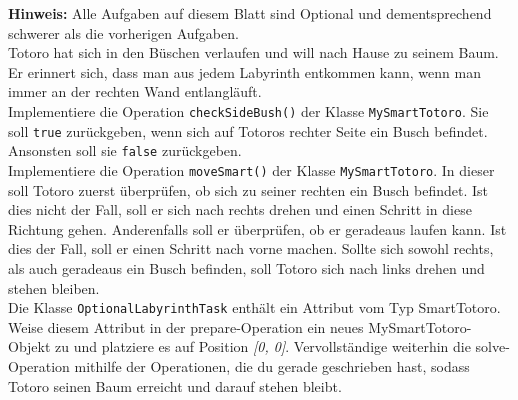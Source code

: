 
\textbf{Hinweis:} Alle Aufgaben auf diesem Blatt sind Optional und dementsprechend schwerer als die vorherigen Aufgaben.\\
	Totoro hat sich in den Büschen verlaufen und will nach Hause zu seinem Baum.
	Er erinnert sich, dass man aus jedem Labyrinth entkommen kann, wenn man immer an der rechten Wand entlangläuft.\\

		 Implementiere die Operation \lstinline{checkSideBush()} der Klasse \lstinline{MySmartTotoro}.
		Sie soll \lstinline{true} zurückgeben, wenn sich auf Totoros rechter Seite ein Busch befindet.
		Ansonsten soll sie \lstinline{false} zurückgeben.\\



		 Implementiere die Operation \lstinline{moveSmart()} der Klasse \lstinline{MySmartTotoro}.
		In dieser soll Totoro zuerst überprüfen, ob sich zu seiner rechten ein Busch befindet.
		Ist dies nicht der Fall, soll er sich nach rechts drehen und einen Schritt in diese Richtung gehen.
		Anderenfalls soll er überprüfen, ob er geradeaus laufen kann. Ist dies der Fall, soll er einen Schritt nach vorne machen.
		Sollte sich sowohl rechts, als auch geradeaus ein Busch befinden, soll Totoro sich nach links drehen und stehen bleiben.\\

		 Die Klasse \lstinline{OptionalLabyrinthTask} enthält ein Attribut vom Typ SmartTotoro.
		Weise diesem Attribut in der prepare-Operation ein neues MySmartTotoro-Objekt zu und
		platziere es auf Position \emph{[0, 0]}.
		Vervollständige weiterhin die solve-Operation mithilfe der Operationen,
		die du gerade geschrieben hast, sodass Totoro seinen Baum erreicht und darauf stehen bleibt.

		

	
